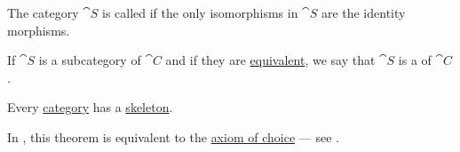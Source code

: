 \begin{definition}\label{def:skeletal_category}
  The category \( \cat{S} \) is called  if the only isomorphisms in \( \cat{S} \) are the identity morphisms.

  If \( \cat{S} \) is a subcategory of \( \cat{C} \) and if they are \hyperref[def:category_equivalence]{equivalent}, we say that \( \cat{S} \) is a  of \( \cat{C} \).
\end{definition}

\begin{theorem}\label{thm:category_skeleton_existence}
  Every \hyperref[def:category]{category} has a \hyperref[def:skeletal_category]{skeleton}.

  In \hyperref[def:zfc]{}, this theorem is equivalent to the \hyperref[def:zfc/choice]{axiom of choice} --- see .
\end{theorem}
